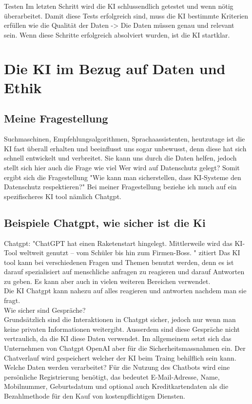 \documentclass{report}
\begin{document}
Testen 
Im letzten Schritt wird die KI schlussendlich getestet und wenn nötig überarbeitet.
Damit diese Tests erfolgreich sind, muss die KI bestimmte Kriterien erfüllen wie die Qualität der Daten -> Die Daten müssen genau und relevant sein.
Wenn diese Schritte erfolgreich absolviert wurden, ist die KI startklar. 

\chapter{Die KI im Bezug auf Daten und Ethik}
\section{Meine Fragestellung}
Suchmaschinen, Empfehlungsalgorithmen, Sprachaassistenten, heutzutage ist die KI fast überall erhalten und beeinflusst uns sogar unbewusst, denn diese hat sich schnell entwickelt und verbreitet. 
Sie kann uns durch die Daten helfen, jedoch stellt sich hier auch die Frage wie viel Wer wird auf Datenschutz gelegt? 
Somit ergibt sich die Fragestellung "Wie kann man sicherstellen, dass KI-Systeme den Datenschutz respektieren?"
Bei meiner Fragestellung beziehe ich much auf ein spezifischeres KI tool nämlich Chatgpt. 

\section {Beispiele Chatgpt, wie sicher ist die Ki}
Chatgpt: "ChatGPT hat einen Raketenstart hingelegt. Mittlerweile wird das KI-Tool weltweit genutzt – vom Schüler bis hin zum Firmen-Boss. " zitiert
    Das KI tool kann bei verschiedenen Fragen und Themen benutzt werden, denn es ist darauf spezialisiert auf menschliche anfragen zu reagieren und darauf Antworten zu geben. 
    Es kann aber auch in vielen weiteren Bereichen verwendet.\\
    Die KI Chatgpt kann nahezu auf alles reagieren und antworten nachdem man sie fragt. 
\\
    Wie sicher sind Gespräche? \\
    Grundsätzlich sind die Interaktionen in Chatgpt sicher, jedoch nur wenn man keine privaten Informationen weitergibt. Ausserdem sind diese Gespräche nicht vertraulich, da die KI diese Daten verwendet.
    Im allgemeinem setzt sich das Unternehmen von Chatgpt OpenAI aber für die Sicherheitsmassnahmen ein.
    Der Chatverlauf wird gespeichert welcher der KI beim Traing behilflich sein kann.
    Welche Daten werden verarbeitet? 
    Für die Nutzung des Chatbots wird eine persönliche Registrierung benötigt, das bedeutet E-Mail-Adresse, Name, Mobilnummer, Geburtsdatum und optional auch Kreditkartendaten als die Bezahlmethode für den Kauf von kostenpflichtigen Diensten.
\end{document}
